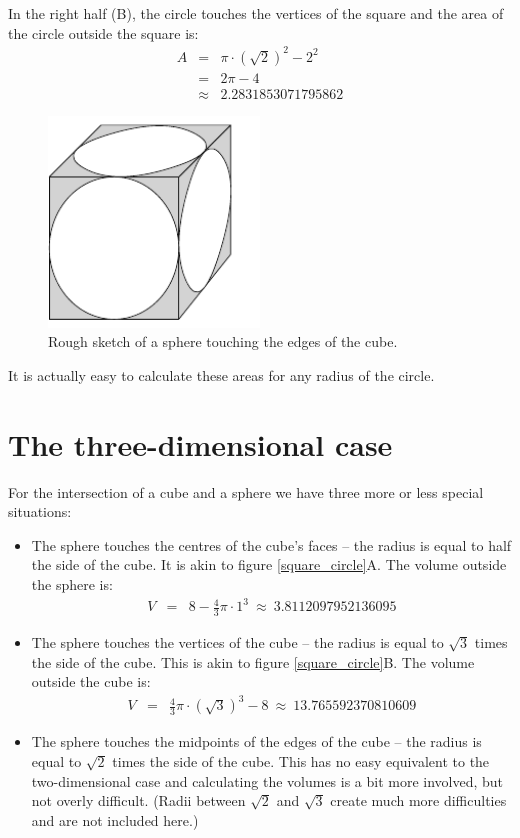 \documentclass[onecolumn]{article}
\begin{document}
In the right half (B), the circle touches the vertices of the square and the area of the circle
outside the square is:
\begin{eqnarray}
\nonumber    A &=& \pi \cdot (\sqrt{2})^2 - 2^2 \\
\nonumber      &=& 2\pi - 4 \\
\nonumber      &\approx& 2.2831853071795862
\end{eqnarray}

\begin{figure}[H]
\caption{Rough sketch of a sphere touching the edges of the cube.}
\label{sphere_cube}
\begin{center}
\includegraphics[width=0.5\textwidth]{sphere_cube_sketch.pdf}
\end{center}
\end{figure}

It is actually easy to calculate these areas for any radius of the circle.

\section*{The three-dimensional case}
For the intersection of a cube and a sphere we have three more or less special situations:
\begin{itemize}
\item
The sphere touches the centres of the cube's faces -- the radius is equal to half the side of the cube.
It is akin to figure \ref{square_circle}A. The volume outside the sphere is:
\begin{eqnarray}
\nonumber    V &=& 8 - \frac{4}{3} \pi \cdot 1^3 ~\approx~ 3.8112097952136095
\end{eqnarray}

\item
The sphere touches the vertices of the cube -- the radius is equal to $\sqrt{3}$ times the side of the cube.
This is akin to figure \ref{square_circle}B. The volume outside the cube is:
\begin{eqnarray}
\nonumber    V &=& \frac{4}{3} \pi \cdot (\sqrt{3})^3 - 8 ~\approx~ 13.765592370810609
\end{eqnarray}
\item
The sphere touches the midpoints of the edges of the cube -- the radius is equal to $\sqrt{2}$ times the side of the cube.
This has no easy equivalent to the two-dimensional case and calculating the volumes is a bit more involved, but not
overly difficult. (Radii between $\sqrt{2}$ and $\sqrt{3}$ create much more difficulties and are not included here.)
\end{itemize}
\end{document}
